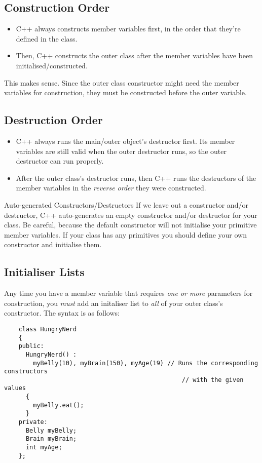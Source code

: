 \documentclass[class=article, crop=false]{standalone}
\begin{document}
  \subsection{Construction Order}
  \begin{itemize}
    \item C++ always constructs member variables first, in the order that they're defined in the class.
    \item Then, C++ constructs the outer class after the member variables have been initialised/constructed.
  \end{itemize}
  \begin{note}{}
    This makes sense. Since the outer class constructor might need the member variables for construction, they must be constructed before the outer variable.
  \end{note}
  \subsection{Destruction Order}
  \begin{itemize}
    \item C++ always runs the main/outer object's destructor first. Its member variables are still valid when the outer destructor runs, so the outer destructor can run properly.
    \item After the outer class's destructor runs, then C++ runs the destructors of the member variables in the \emph{reverse order} they were constructed.
  \end{itemize}
  \begin{note}{Auto-generated Constructors/Destructors}
    If we leave out a constructor and/or destructor, C++ auto-generates an empty constructor and/or destructor for your class. Be careful, because the default constructor will not initialise your primitive member variables. If your class has any primitives you should define your own constructor and initialise them.
  \end{note}
  \subsection{Initialiser Lists}
  Any time you have a member variable that requires \emph{one or more} parameters for construction, you \emph{must} add an initaliser list to \emph{all} of your outer class's constructor. The syntax is as follows:
  \begin{lstlisting}
    class HungryNerd
    {
    public:
      HungryNerd() :
        myBelly(10), myBrain(150), myAge(19) // Runs the corresponding constructors
                                                 // with the given values
      {
        myBelly.eat();
      }
    private:
      Belly myBelly;
      Brain myBrain;
      int myAge;
    };
  \end{lstlisting}
  \newpage
\end{document}
